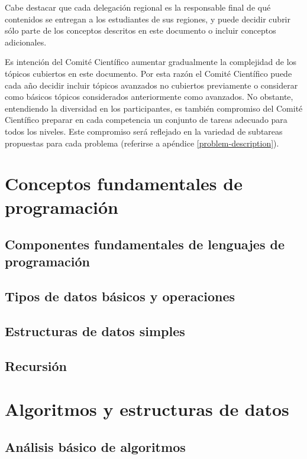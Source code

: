 \documentclass{article}
\begin{document}
Cabe destacar que cada delegación regional es la responsable final de qué
contenidos se entregan a los estudiantes de sus regiones, y puede decidir cubrir
sólo parte de los conceptos descritos en este documento o incluir conceptos
adicionales.

Es intención del Comité Científico aumentar gradualmente la complejidad de los
tópicos cubiertos en este documento.
Por esta razón el Comité Científico puede cada año decidir incluir tópicos
avanzados no cubiertos previamente o considerar como básicos tópicos
considerados anteriormente como avanzados.
No obstante, entendiendo la diversidad en los participantes, es también
compromiso del Comité Científico preparar en cada competencia un conjunto de
tareas adecuado para todos los niveles.
Este compromiso será reflejado en la variedad de subtareas propuestas para cada
problema (referirse a apéndice \ref{problem-description}).

\section{Conceptos fundamentales de programación}

\subsection{Componentes fundamentales de lenguajes de programación}


\subsection{Tipos de datos básicos y operaciones}


\subsection{Estructuras de datos simples}


\subsection{Recursión}


\section{Algoritmos y estructuras de datos}
\subsection{Análisis básico de algoritmos}
\label{algorithm-analysis}

\end{document}
